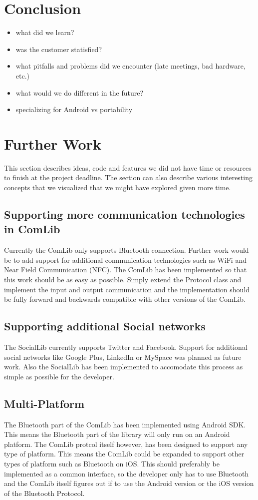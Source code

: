 \section{Conclusion}
\begin{itemize}
\item what did we learn?
\item was the customer statisfied?
\item what pitfalls and problems did we encounter (late meetings, bad hardware, etc.)
\item what would we do different in the future?
\item specializing for Android vs portability
\end{itemize}

\section{Further Work}
This section describes ideas, code and features we did not have time or resources to
finish at the project deadline. The section can also describe various interesting concepts 
that we visualized that we might have explored given more time.

\subsection{Supporting more communication technologies in ComLib}
Currently the ComLib only supports Bluetooth connection. Further work would be
to add support for additional communication technologies such as WiFi and Near Field 
Communication (NFC). The ComLib has been implemented so that this work should
be as easy as possible. Simply extend the Protocol class and implement the input and
output communication and the implementation should be fully forward and backwards
compatible with other versions of the ComLib.

\subsection{Supporting additional Social networks}
The SocialLib currently supports Twitter and Facebook. Support for additional social
networks like Google Plus, LinkedIn or MySpace was planned as future work. Also the
SocialLib has been implemented to accomodate this process as simple as possible
for the developer.

\subsection{Multi-Platform}
The Bluetooth part of the ComLib has been implemented using Android SDK. This means 
the Bluetooth part of the library will only run on an Android platform. The ComLib protcol
itself however, has been designed to support any type of platform. This means the ComLib
could be expanded to support other types of platform such as Bluetooth on iOS. This
should preferably be implemented as a common interface, so the developer only has to use
Bluetooth and the ComLib itself figures out if to use the Android version or the iOS version of
the Bluetooth Protocol.


